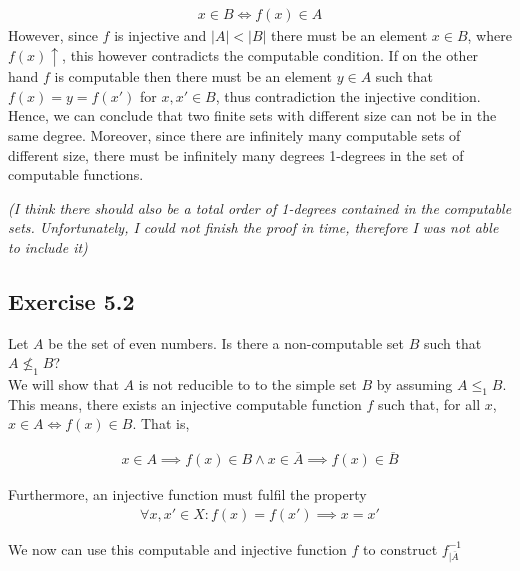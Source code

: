 \documentclass[11pt,a4paper]{article}
\begin{document}
\begin{equation*}
\begin{split}
x \in B  \iff f(x) \in A
\end{split}
\end{equation*}
However, since $f$ is injective and $|A|<|B|$ there must be an element $x \in B$, where $f(x)\uparrow$, this however contradicts 
the computable condition.
If on the other hand $f$ is computable then there must be an element $y \in A$ such that $f(x)=y=f(x')$ for $x,x' \in B$, thus 
contradiction the injective condition. Hence, we can conclude that two finite sets with different size can not be in the same degree.
Moreover, since there are infinitely many computable sets of different size, there must be infinitely many degrees 1-degrees in the 
set of computable functions.
\linebreak

\textit{(I think there should also be a total order of 1-degrees contained in the computable sets. Unfortunately, I could not finish the proof in time, therefore I was not able to include it)}



\subsection*{Exercise 5.2}
Let $A$ be the set of even numbers. Is there a non-computable set $B$ such that $A \nleq_1 B$? \\
We will show that $A$ is not reducible to to the simple set $B$ by assuming $A \leq_1 B$.
This means, there exists an injective computable function $f$ such that, for all $x$,
$x \in A \iff f(x) \in B$. That is,

\begin{equation*}
\begin{split}
x \in A  \implies f(x)\in B \wedge x \in \overline{A}  \implies f(x) \in \overline{B}
\end{split}
\end{equation*}

Furthermore, an injective function must fulfil the property 
\begin{equation*}
\begin{split}
\forall x, x' \in X: f(x)=f(x') \implies x= x'
\end{split}
\end{equation*}



We now can use this computable and injective function $f$ to construct $f_{|\overline{A}}^{-1}$
\end{document}
